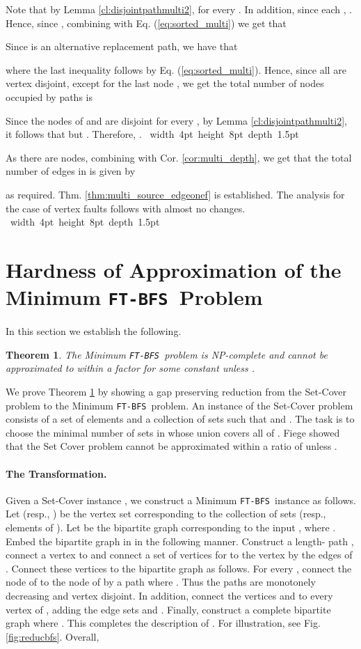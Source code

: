 \documentclass[12pt]{article}
\newtheorem{theorem}{Theorem}[section]
\def\blackslug{\hbox{\hskip 1pt \vrule width 4pt height 8pt
    depth 1.5pt \hskip 1pt}}
\def\QED{\quad\blackslug\lower 8.5pt\null\par}
\def\FTBFS{\mbox{\tt FT-BFS}}
\begin{document}
{Note that by Lemma \ref{cl:disjointpathmulti2},  for every . In addition, since each , .
Hence, since , combining with Eq. (\ref{eq:sorted_multi}) we get that

Since  is an alternative  replacement path, we have that

where the last inequality follows by Eq. (\ref{eq:sorted_multi}).
Hence, since all  are vertex disjoint, except for the last node , we get the total number of nodes 
occupied by  paths is

Since the nodes of  and  are disjoint for every , by Lemma \ref{cl:disjointpathmulti2},
it follows that  but . Therefore, .
\QED
As there are  nodes, combining with Cor. \ref{cor:multi_depth}, we get that the total number of edges in  is given by

as required. Thm. \ref{thm:multi_source_edgeonef} is established.
The analysis for the case of vertex faults follows with almost no changes.
\QED
}\APPENDUPPERMULTI
\section{Hardness of Approximation of the Minimum \FTBFS\ Problem}
\label{sec:hardness}
In this section we establish the following.
\begin{theorem}
\label{thm:hardness}
The Minimum \FTBFS\ problem is NP-complete and cannot be approximated to within a factor  for some constant  unless .
\end{theorem}
We prove Theorem \ref{thm:hardness} by showing a gap preserving reduction
from the Set-Cover problem to the Minimum \FTBFS\ problem.
An instance  of the Set-Cover problem consists of
a set of  elements  and
a collection of  sets 
such that  and .
The task is to choose the minimal number of sets
in  whose union covers all of .
Fiege \cite{Feige98} showed that the Set Cover problem cannot be approximated
within a ratio of  unless .

\paragraph{The Transformation.}
Given a Set-Cover instance ,
we construct a Minimum \FTBFS\ instance 
as follows. Let  (resp.,  )
be the vertex set corresponding to the collection of sets 
(resp., elements of ). Let  be the bipartite
graph corresponding to the input , where
.
Embed the bipartite graph  in  in the following manner.
Construct a length- path ,
connect a vertex  to  and connect a set of vertices  for   to the vertex  by the edges of .
Connect these vertices to the bipartite graph  as follows.
For every , connect the node  of  to the node  of  by a path  where .
Thus the paths  are monotonely decreasing and vertex disjoint.
In addition, connect the vertices  and  to every vertex of , adding the edge sets  and .
Finally, construct a complete bipartite graph  where
.
This completes the description of . For illustration, see
Fig. \ref{fig:reducbfs}.
Overall,
\end{document}
